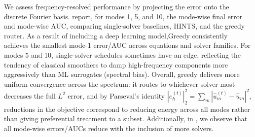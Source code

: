 \documentclass{article}
\begin{document}
We assess frequency-resolved performance by projecting the error onto the discrete Fourier basis.  report, for modes 1, 5, and 10, the mode-wise final error and mode-wise AUC, comparing single-solver baselines, HINTS, and the greedy router. As a result of including a deep learning model,Greedy consistently achieves the smallest mode-1 error/AUC across equations and solver families. For modes 5 and 10, single-solver schedules sometimes have an edge, reflecting the tendency of classical smoothers to damp high-frequency components more aggressively than ML surrogates (spectral bias). Overall, greedy delivers more uniform convergence across the spectrum: it routes to whichever solver most decreases the full $L^2$ error, and by Parseval’s identity $|e_h^{(t)}|_2^2=\sum_m|\hat u_m^{(t)}-\hat u_m|^2$, reductions in the objective correspond to reducing energy across all modes rather than giving preferential treatment to a subset. Additionally, in , we observe that all mode-wise errors/AUCs reduce with the inclusion of more solvers.
\end{document}
